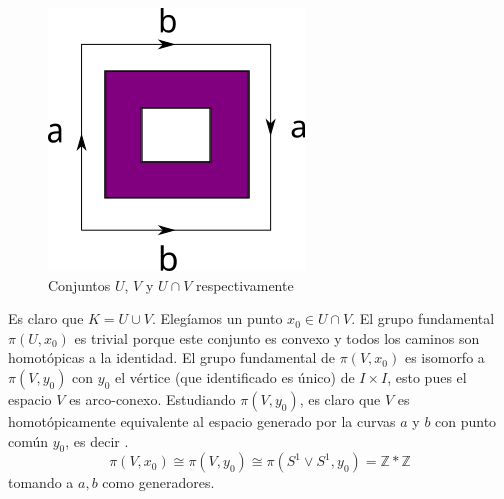 \begin{ejemplo}
\begin{figure}[h]
    \hspace{3mm}
    \includegraphics[scale=0.5]{./imagenes/kleinUV.png}
    \caption*{Conjuntos \(U\), \(V\) y \(U \cap V\) respectivamente}
  \end{figure}
  Es claro que \(K = U \cup V\). Elegíamos un punto \(x_0 \in U \cap V\).
  El grupo fundamental \(\pi \left( U , x_0 \right) \) es trivial porque
  este conjunto es convexo y todos los caminos son homotópicas a la
  identidad. El grupo fundamental de \(\pi (V, x_0)\) es isomorfo a
  \(\pi (V, y_0)\) con \(y_0\) el vértice (que identificado es único) de \(I
  \times I\), esto pues el espacio \(V\) es arco-conexo. Estudiando
  \(\pi (V, y_0)\), es claro que \(V\) es homotópicamente equivalente al
  espacio generado por la curvas \(a\) y \(b\) con punto común \(y_0\),
  es decir .
  \[ \pi (V, x_0) \cong \pi (V, y_0) \cong \pi (S^1 \vee S^1, y_0) =
    \mathbb Z * \mathbb Z \]
  tomando a \(a,b\) como generadores.


\end{ejemplo}
